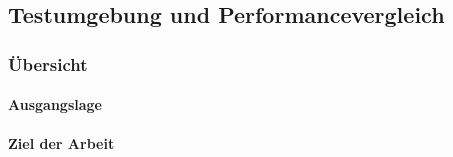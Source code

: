 \vspace*{4cm}
\begin{center}
\part{Testumgebung und Performancevergleich}
\end{center}
\vspace*{\fill}
\clearpage

\section{Übersicht}\label{sec:Uebersicht}



\subsection{Ausgangslage}\label{subsec:Ausgangslage}



\subsection{Ziel der Arbeit}\label{subsec:ZielderArbeit}









